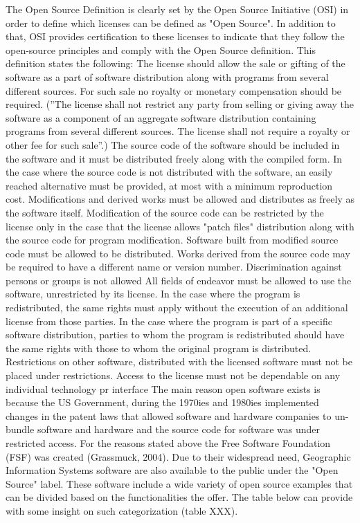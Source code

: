 The Open Source Definition  is clearly set by the Open Source Initiative (OSI) in order to define which licenses can be defined as "Open Source". In addition to that, OSI provides certification to these licenses to indicate that they follow the open-source principles and comply with the Open Source definition. This definition states the following:
The license should allow the sale or gifting of the software as a part of software distribution along with programs from several different sources. For such sale no royalty or monetary compensation should be required. (''The license shall not restrict any party from selling or giving away the software as a component of an aggregate software distribution containing programs from several different sources. The license shall not require a royalty or other fee for such sale''.)
The source code of the software should be included in the software and it must be distributed freely along with the compiled form. In the case where the source code is not distributed with the software, an easily reached alternative must be provided, at most with a minimum reproduction cost.
Modifications and derived works must be allowed and distributes as freely as the software itself.
Modification of the source code can be restricted by the license only in the case that the license allows "patch files" distribution along with the source code for program modification. Software built from modified source code must be allowed to be distributed. Works derived from the source code may be required to have a different name or version number.
Discrimination against persons or groups is not allowed
All fields of endeavor must be allowed to use the software, unrestricted by its license.
In the case where the program is redistributed, the same rights must apply without the execution of an additional license from those parties.
In the case where the program is part of a specific software distribution, parties to whom the program is redistributed should have the same rights with those to  whom the original program is distributed.
Restrictions on other software, distributed with the licensed software must not be placed under restrictions.
Access to the license must not be dependable on any individual technology pr interface
The main reason open software exists is because the US Government, during the 1970ies and 1980ies implemented changes in the patent laws that allowed software and hardware companies to un-bundle software and hardware  and the source code for software was under restricted access. For the reasons stated above the Free Software Foundation (FSF) was created (Grassmuck, 2004).
Due to their widespread need, Geographic Information Systems software are also available to the public under the "Open Source" label. These software include a wide variety of open source examples that can be divided based on the functionalities the offer. The table below can provide with some insight on such categorization (table XXX). 

